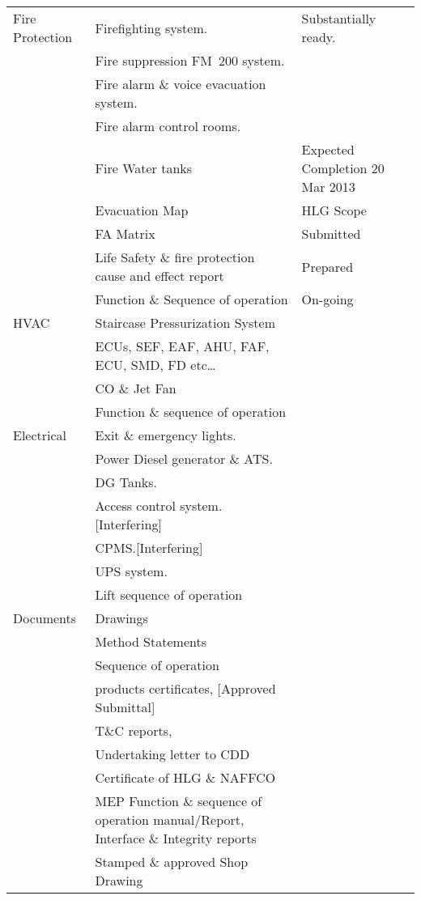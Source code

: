 \label{cdd}
{\small\raggedright
\begin{longtable}{p{2.3cm}p{3.0cm}p{4.3cm}}

\toprule
Fire Protection    &Firefighting system.  & Substantially ready.\\
    &Fire suppression FM~200 system. & \\
	&Fire alarm \& voice evacuation system. &\\
	&Fire alarm control rooms. &\\
	&Fire Water tanks & Expected Completion 20 Mar 2013\\
	&Evacuation Map & HLG Scope\\
	&FA Matrix & Submitted\\
	&Life Safety \& fire protection cause and 
         effect report & Prepared\\
	&Function \& Sequence of operation & On-going\\
\midrule

HVAC	&Staircase Pressurization System &\\
	&ECUs, SEF, EAF, AHU, FAF, ECU, SMD, FD etc… &\\
	&CO \& Jet Fan &\\
	&Function \& sequence of operation &\\
\midrule


Electrical	&Exit \& emergency lights. &\\
	&Power Diesel generator \& ATS. &\\
	&DG Tanks. &\\
	&Access control system. [Interfering] &\\
	&CPMS.[Interfering] &\\
	&UPS system. &\\
	&Lift sequence of operation &\\
\midrule

Documents	&Drawings &\\
	&Method Statements &\\
	&Sequence of operation &\\
	&products certificates, [Approved Submittal] &\\
	&T\&C reports, &\\
	&Undertaking letter to CDD &\\
	&Certificate of HLG \& NAFFCO &\\
	&MEP Function \& sequence of operation manual/Report, Interface \& Integrity reports &\\
	&Stamped \& approved Shop Drawing &\\
\bottomrule
\end{longtable}
}




